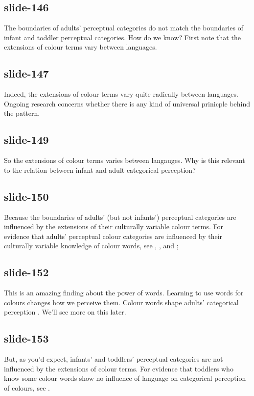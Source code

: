 \documentclass[12pt,\papersize]{extarticle}
\begin{document}
 
\subsection{slide-146}
The boundaries of adults' perceptual categories do not match the boundaries of infant and toddler perceptual categories.
How do we know?
First note that the extensions of colour terms vary between languages.
 
 
\subsection{slide-147}
Indeed, the extensions of colour terms vary quite radically between languages.
Ongoing research concerns whether there is any kind of universal prinicple behind the pattern.
 
 
\subsection{slide-149}
So the extensions of colour terms varies between langauges.
Why is this relevant to the relation between infant and adult categorical perception?
 
 
\subsection{slide-150}
Because the boundaries of adults' (but not infants') perceptual categories are influenced by the extensions of their culturally variable colour terms.
For evidence that adults' perceptual colour categories are influenced by their culturally variable knowledge of colour words, see \citet{Kay:2006ly}, \citet{Roberson:2007wg}, and \citet{Winawer:2007im};
 
 
\subsection{slide-152}
This is an amazing finding about the power of words.
Learning to use words for colours changes how we perceive them.
Colour words shape adults’ categorical perception \citep{Roberson:2007wg,Winawer:2007im}.
We'll see more on this later.
 
 
\subsection{slide-153}
But, as you'd expect, infants’ and toddlers’ perceptual categories are not influenced by the extensions of colour terms.
For evidence that toddlers who know some colour words show no influence of language on categorical perception of colours, see \citet{Franklin:2005hp}.
 
\end{document}
